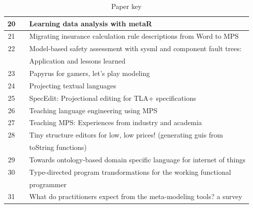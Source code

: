 \begin{table}[htbp]
\begin{center}
\begin{tabular}{ |c  c|l | }
            20  & \cite{simi2021learning_SLR}            & Learning data analysis with metaR                                           \\ \hline
            21  & \cite{stotz2021migrating_SLR}          & Migrating insurance calculation rule descriptions from Word to MPS          \\ \hline
            22  & \cite{munk2020model_SLR}               & Model-based safety assessment with sysml and component fault trees:         \\
                &                                        & Application and lessons learned                                             \\ \hline
            23  & \cite{bucchiarone2020papyrus_SLR}      & Papyrus for gamers, let’s play modeling                                     \\ \hline
            24  & \cite{merino2021projecting_SLR}        & Projecting textual languages                                                \\ \hline
            25  & \cite{cuinat2020specedit_SLR}          & SpecEdit: Projectional editing for TLA+ specifications                      \\ \hline
            26  & \cite{prinz2021teaching_SLR}           & Teaching language engineering using MPS                                     \\ \hline
            27  & \cite{barash2021teaching_SLR}          & Teaching MPS: Experiences from industry and academia                        \\ \hline
            28  & \cite{hempel2020tiny_SLR}              & Tiny structure editors for low, low prices! (generating guis from           \\
                &                                        & toString functions)                                                         \\ \hline
            29  & \cite{negm2020towards_SLR}             & Towards ontology-based domain specific language for internet of things      \\ \hline
            30  & \cite{lubin2020type_SLR}               & Type-directed program transformations for the working functional            \\
                &                                        & programmer                                                                  \\ \hline
            31  & \cite{ozkaya2021practitioners_SLR}     & What do practitioners expect from the meta-modeling tools? a survey         \\ \hline
        \end{tabular}
    \end{center}
    \caption{Paper key}
    \label{table:paper_key}
\end{table}

